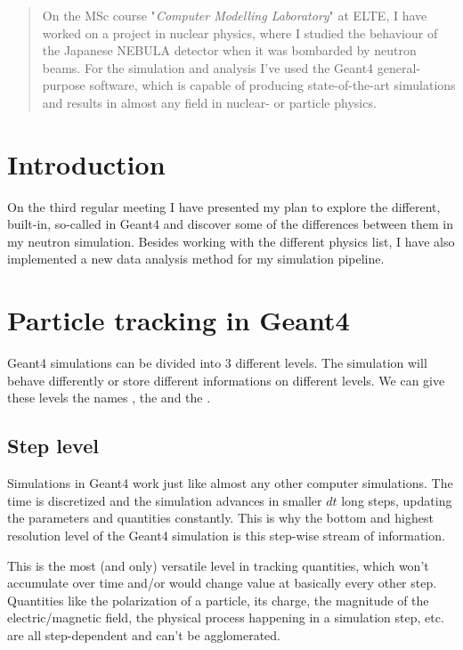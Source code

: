 \begin{abstract}
	On the MSc course "\textit{Computer Modelling Laboratory}" at ELTE, I have worked on a project in nuclear physics, where I studied the behaviour of the Japanese NEBULA detector when it was bombarded by neutron beams. For the simulation and analysis I've used the Geant4 general-purpose software, which is capable of producing state-of-the-art simulations and results in almost any field in nuclear- or particle physics.
\end{abstract}

\begin{multicols}{2}
\section{Introduction}
On the third regular meeting I have presented my plan to explore the different, built-in, so-called  in Geant4 and discover some of the differences between them in my neutron simulation. Besides working with the different physics list, I have also implemented a new data analysis method for my simulation pipeline.

\section{Particle tracking in Geant4}
Geant4 simulations can be divided into 3 different levels. The simulation will behave differently or store different informations on different levels. We can give these levels the names , the  and the .

\subsection{Step level}
Simulations in Geant4 work just like almost any other computer simulations. The time is discretized and the simulation advances in smaller $dt$ long steps, updating the parameters and quantities constantly. This is why the bottom and highest resolution level of the Geant4 simulation is this step-wise stream of information.

This is the most (and only) versatile level in tracking quantities, which won't accumulate over time and/or would change value at basically every other step. Quantities like the polarization of a particle, its charge, the magnitude of the electric/magnetic field, the physical process happening in a simulation step, etc. are all step-dependent and can't be agglomerated.


\end{multicols}
